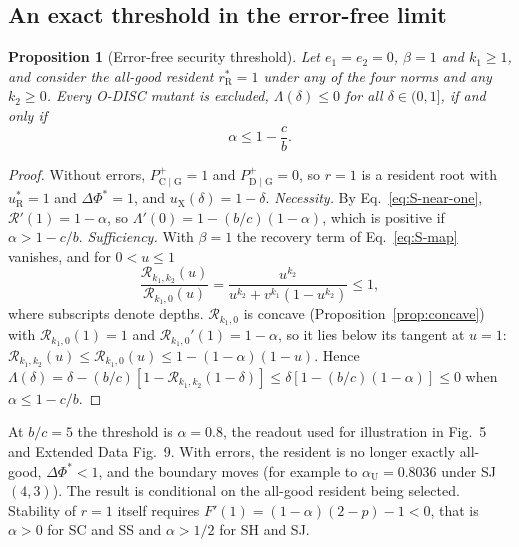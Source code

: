 \documentclass[fleqn,10pt]{article}
\theoremstyle{plain}
\newtheorem{proposition}{Proposition}
\theoremstyle{remark}
\newcommand{\FigOpportunism}{5}
\newcommand{\EDSecurity}{9}
\newcommand{\Rm}{\mathcal R}
\newcommand{\Pp}[2]{P^+_{\mathrm{#1}\mid\mathrm{#2}}}
\newcommand{\rR}{r^*_{\mathrm R}}
\newcommand{\uR}{u^*_{\mathrm R}}
\begin{document}
\subsection{An exact threshold in the error-free limit}
\begin{proposition}[Error-free security threshold]\label{prop:errorfree}
Let $e_1=e_2=0$, $\beta=1$ and $k_1\ge1$, and consider the all-good resident
$\rR=1$ under any of the four norms and any $k_2\ge0$. Every O-DISC mutant is
excluded, $\Lambda(\delta)\le0$ for all $\delta\in(0,1]$, if and only if
\begin{equation}
\alpha\le1-\frac cb .
\label{eq:S-errorfree}
\end{equation}
\end{proposition}
\begin{proof}
Without errors, $\Pp CG=1$ and $\Pp DG=0$, so $r=1$ is a resident root with
$\uR=1$ and $\Delta\Phi^*=1$, and $u_{\mathrm X}(\delta)=1-\delta$.
\emph{Necessity.} By Eq.~\eqref{eq:S-near-one}, $\Rm'(1)=1-\alpha$, so
$\Lambda'(0)=1-(b/c)(1-\alpha)$, which is positive if $\alpha>1-c/b$.
\emph{Sufficiency.} With $\beta=1$ the recovery term of Eq.~\eqref{eq:S-map}
vanishes, and for $0<u\le1$
\[
\frac{\Rm_{k_1,k_2}(u)}{\Rm_{k_1,0}(u)}=\frac{u^{k_2}}{u^{k_2}+v^{k_1}(1-u^{k_2})}\le1,
\]
where subscripts denote depths. $\Rm_{k_1,0}$ is concave
(Proposition~\ref{prop:concave}) with $\Rm_{k_1,0}(1)=1$ and
$\Rm_{k_1,0}'(1)=1-\alpha$, so it lies below its tangent at $u=1$:
$\Rm_{k_1,k_2}(u)\le\Rm_{k_1,0}(u)\le1-(1-\alpha)(1-u)$. Hence
$\Lambda(\delta)=\delta-(b/c)[1-\Rm_{k_1,k_2}(1-\delta)]\le\delta[1-(b/c)(1-\alpha)]\le0$
when $\alpha\le1-c/b$.
\end{proof}
At $b/c=5$ the threshold is $\alpha=0.8$, the readout used for illustration in
Fig.~\FigOpportunism{} and Extended Data Fig.~\EDSecurity. With errors, the
resident is no longer exactly all-good, $\Delta\Phi^*<1$, and the boundary moves
(for example to $\alpha_{\mathrm U}=0.8036$ under SJ $(4,3)$). The result is
conditional on the all-good resident being selected. Stability of $r=1$ itself
requires $F'(1)=(1-\alpha)(2-p)-1<0$, that is $\alpha>0$ for SC and SS and
$\alpha>1/2$ for SH and SJ.
\end{document}
